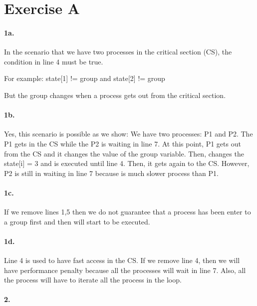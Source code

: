 \section*{Exercise A}

\paragraph{1a.}
In the scenario that we have two processes in the critical section (CS), 
the condition in line 4 must be true.

For example: state[1] != group and state[2] != group

But the group changes when a process gets out from the critical
section.

\paragraph{1b.}
Yes, this scenario is possible as we show:
We have two processes: P1 and P2. The P1 gets in the CS while the P2
is waiting in line 7. At this point, P1 gets out from the CS and it
changes the value of the group variable. Then, changes the state[i] =
3 and is executed until line 4. Then, it gets again to the CS.
However, P2 is still in waiting in line 7 because is much slower
process than P1.

\paragraph{1c.}
If we remove lines 1,5 then we do not guarantee that a process has
been enter to a group first and then will start to be executed.

\paragraph{1d.}
Line 4 is used to have fast access in the CS. If we remove line 4,
then we will have performance penalty because all the processes will
wait in line 7. Also, all the process will have to iterate all the
process in the loop.

\paragraph{2.}

